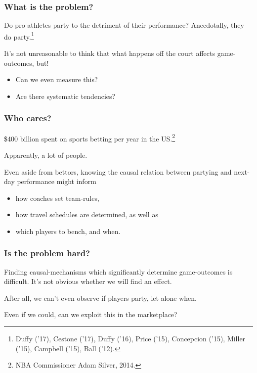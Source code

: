 \documentclass{beamer}
\begin{document}
  \begin{frame} \maketitle \end{frame}

\begin{frame}   \frametitle{What is the problem?}
  \begin{block}{Do pro athletes party to the detriment of their performance?}
    Anecdotally, they do party.\footnote{Duffy ('17), Cestone ('17), Duffy ('16), 
      Price ('15), Concepcion ('15), Miller ('15), Campbell ('15), Ball ('12).}

    \vspace{12pt}It's not unreasonable to think that what happens off the court affects game-outcomes, but!
    \begin{itemize}       \item Can we even measure this?
      \item Are there systematic tendencies?     \end{itemize}
  \end{block} \end{frame}

\begin{frame}   
  \frametitle{Who cares?}
  \begin{block}{\$400 billion spent on sports betting per year in the US.\footnote{NBA Commissioner Adam Silver, 2014.}}

    Apparently, a lot of people.

    \vspace{12pt}Even aside from bettors, knowing the causal relation between partying and next-day performance might inform
    \begin{itemize}       
      \item how coaches set team-rules, 
      \item how travel schedules are determined, as well as
      \item which players to bench, and when.
      \end{itemize}
  \end{block}
\end{frame}

\begin{frame}   
  \frametitle{Is the problem hard?}

  \begin{block}{Finding causal-mechanisms which significantly determine game-outcomes is difficult.}       It's not obvious whether we will find an effect. 

      \vspace{12pt}After all, we can't even observe if players party, let alone when.

      Even if we could, can we exploit this in the marketplace?   \end{block}

\end{frame}
\end{document}
